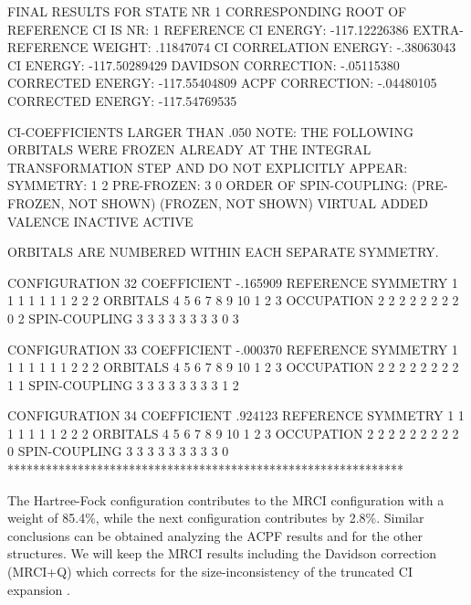 \begin{sourcelisting}
               FINAL RESULTS FOR STATE NR   1
 CORRESPONDING ROOT OF REFERENCE CI IS NR:  1
            REFERENCE CI ENERGY: -117.12226386
         EXTRA-REFERENCE WEIGHT:     .11847074
          CI CORRELATION ENERGY:    -.38063043
                      CI ENERGY: -117.50289429
            DAVIDSON CORRECTION:    -.05115380
               CORRECTED ENERGY: -117.55404809
                ACPF CORRECTION:    -.04480105
               CORRECTED ENERGY: -117.54769535

      CI-COEFFICIENTS LARGER THAN  .050
  NOTE: THE FOLLOWING ORBITALS WERE FROZEN
  ALREADY AT THE INTEGRAL TRANSFORMATION STEP
  AND DO NOT EXPLICITLY APPEAR:
        SYMMETRY:   1   2
      PRE-FROZEN:   3   0
  ORDER OF SPIN-COUPLING: (PRE-FROZEN, NOT SHOWN)
                          (FROZEN, NOT SHOWN)
                           VIRTUAL
                           ADDED VALENCE
                           INACTIVE
                           ACTIVE

  ORBITALS ARE NUMBERED WITHIN EACH SEPARATE SYMMETRY.


      CONFIGURATION     32   COEFFICIENT  -.165909   REFERENCE
 SYMMETRY             1  1  1  1  1  1  1  2  2  2
 ORBITALS             4  5  6  7  8  9 10  1  2  3
 OCCUPATION           2  2  2  2  2  2  2  2  0  2
 SPIN-COUPLING        3  3  3  3  3  3  3  3  0  3


      CONFIGURATION     33   COEFFICIENT  -.000370   REFERENCE
 SYMMETRY             1  1  1  1  1  1  1  2  2  2
 ORBITALS             4  5  6  7  8  9 10  1  2  3
 OCCUPATION           2  2  2  2  2  2  2  2  1  1
 SPIN-COUPLING        3  3  3  3  3  3  3  3  1  2

      CONFIGURATION     34   COEFFICIENT   .924123   REFERENCE
 SYMMETRY             1  1  1  1  1  1  1  2  2  2
 ORBITALS             4  5  6  7  8  9 10  1  2  3
 OCCUPATION           2  2  2  2  2  2  2  2  2  0
 SPIN-COUPLING        3  3  3  3  3  3  3  3  3  0
**************************************************************
\end{sourcelisting}

The Hartree-Fock configuration contributes to the
MRCI configuration with a weight of 85.4\%, while the next configuration
contributes by 2.8\%. Similar conclusions can be obtained analyzing the
ACPF results and for the other structures. We will keep the MRCI results
including the Davidson correction (MRCI+Q) which corrects for the 
size-inconsistency of the truncated CI expansion \cite{Taylor:92b}.

